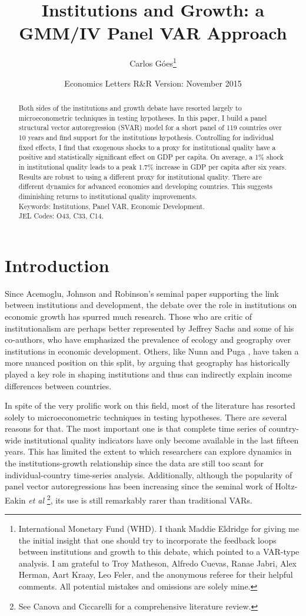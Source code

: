 \documentclass{article}
\title{Institutions and Growth: a GMM/IV Panel VAR Approach}
\author{Carlos Góes\footnote{International Monetary Fund (WHD). I thank Maddie Eldridge \parencite*{maddie} for giving me the initial insight that one should try to incorporate the feedback loops between institutions and growth to this debate, which pointed to a VAR-type analysis. I am grateful to Troy Matheson, Alfredo Cuevas, Ranae Jabri, Alex Herman, Aart Kraay, Leo Feler, and the anonymous referee for their helpful comments. All potential mistakes and omissions are solely mine.}}
\date{Economics Letters R\&R Version: November 2015}
\begin{document}
\maketitle

\begin{abstract}
Both sides of the institutions and growth debate have resorted largely to microeconometric techniques in testing hypotheses. In this paper, I build a panel structural vector autoregression (SVAR) model for a short panel of 119 countries over 10 years and find support for the institutions hypothesis. Controlling for individual fixed effects, I find that exogenous shocks to a proxy for institutional quality have a positive and statistically significant effect on GDP per capita. On average, a 1\% shock in institutional quality leads to a peak 1.7\% increase in GDP per capita after six years. Results are robust to using a different proxy for institutional quality. There are different dynamics for advanced economies and developing countries. This suggests diminishing returns to institutional quality improvements. \\
Keywords: Institutions, Panel VAR, Economic Development. \\
JEL Codes: O43, C33, C14.
\end{abstract}

\newpage

\section{Introduction}

Since Acemoglu, Johnson and Robinson's \parencite*{acemoglu} seminal paper supporting the link between institutions and development, the debate over the role in institutions on economic growth has spurred much research. Those who are critic of institutionalism are perhaps better represented by Jeffrey Sachs \parencite*{sachs} and some of his co-authors, who have emphasized the prevalence of ecology and geography over institutions in economic development. Others, like Nunn and Puga \parencite*{np}, have taken a more nuanced position on this split, by arguing that geography has historically played a key role in shaping institutions and thus can indirectly explain income differences between countries.

In spite of the very prolific work on this field, most of the literature has resorted solely to microeconometric techniques in testing hypotheses. There are several reasons for that. The most important one is that complete time series of country-wide institutional quality indicators have only become available in the last fifteen years. This has limited the extent to which researchers can explore dynamics in the institutions-growth relationship since the data are still too scant for individual-country time-series analysis. Additionally, although the popularity of  panel vector autoregressions has been increasing since the seminal work of Holtz-Eakin \textit{et al} \parencite*{he}\footnote{See Canova and Ciccarelli \parencite*{canova} for a comprehensive literature review.}, its use is still remarkably rarer than traditional VARs.
\end{document}
